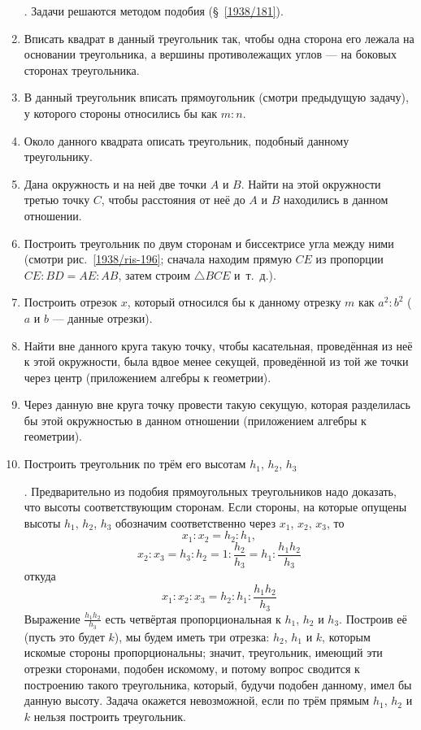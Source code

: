 \documentclass[twoside]{book}
\begin{document}
\begin{enumerate}[resume]
\smallskip
{}.
Задачи решаются методом подобия (§~\ref{1938/181}).

 \item
Вписать квадрат в данный треугольник так, чтобы одна сторона его лежала на основании треугольника, а вершины противолежащих углов — на боковых сторонах треугольника.

 \item
В данный треугольник вписать прямоугольник (смотри предыдущую задачу), у которого стороны относились бы как $m:n$.

 \item
Около данного квадрата описать треугольник, подобный данному треугольнику.

 \item
Дана окружность и на ней две точки $A$ и $B$.
Найти на этой окружности третью точку $C$, чтобы расстояния от неё до $A$ и $B$ находились в данном отношении.

 \item
Построить треугольник по двум сторонам и биссектрисе угла между ними (смотри рис.~\ref{1938/ris-196};
сначала находим прямую $CE$ из пропорции $CE:BD=AE:AB$, затем строим $\triangle BCE$ и~т.~д.).

 \item
Построить отрезок $x$, который относился бы к данному отрезку $m$ как $a^2:b^2$ ($a$ и $b$ — данные отрезки).

 \item
Найти вне данного круга такую точку, чтобы касательная, проведённая из неё к этой окружности, была вдвое менее секущей, проведённой из той же точки через центр (приложением алгебры к геометрии).

 \item
Через данную вне круга точку провести такую секущую, которая разделилась бы этой окружностью в данном отношении (приложением алгебры к геометрии).

 \item
Построить треугольник по трём его высотам $h_1$, $h_2$, $h_3$

\smallskip
{}.
Предварительно из подобия прямоугольных треугольников надо доказать, что высоты  соответствующим сторонам.
Если стороны, на которые опущены высоты $h_1$, $h_2$, $h_3$ обозначим соответственно через $x_1$, $x_2$, $x_3$, то
\[x_1:x_2=h_2:h_1,\]
\[x_2:x_3=h_3:h_2=1:\frac{h_2}{h_3}=h_1:\frac{h_1h_2}{h_3}\]
откуда 
\[x_1:x_2:x_3=h_2:h_1:\frac{h_1h_2}{h_3}\]
Выражение $\frac{h_1h_2}{h_3}$ есть четвёртая пропорциональная к $h_1$, $h_2$ и $h_3$.
Построив её (пусть это будет $k$), мы будем иметь три отрезка:
$h_2$, $h_1$ и $k$, которым искомые стороны пропорциональны;
значит, треугольник, имеющий эти отрезки сторонами, подобен искомому, и потому вопрос сводится к построению такого треугольника, который, будучи подобен данному, имел бы данную высоту.
Задача окажется невозможной, если по трём прямым $h_1$, $h_2$ и $k$ нельзя построить треугольник.


\end{enumerate}
\end{document}
